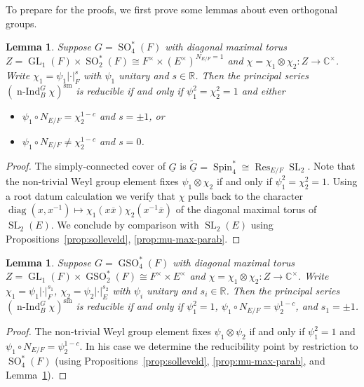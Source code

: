 \documentclass[a4paper]{amsart}
\numberwithin{equation}{section}
\newtheorem{lem}[thm]{Lemma}
\theoremstyle{remark}
\theoremstyle{definition}
\DeclareMathOperator{\nInd}{n-Ind}
\DeclareMathOperator{\diag}{diag}
\DeclareMathOperator{\Res}{Res}
\newcommand{\C}{\mathbb{C}}
\newcommand{\R}{\mathbb{R}}
\DeclareMathOperator{\SL}{SL}
\DeclareMathOperator{\SO}{SO}
\DeclareMathOperator{\GSO}{GSO}
\DeclareMathOperator{\Spin}{Spin}
\DeclareMathOperator{\GL}{GL}
\newcommand{\sm}{\mathrm{sm}}
\newcommand{\alggrp}[1]{\underline{#1}}
\renewcommand{\o}[1]{\overline{#1}}
\newcommand{\wt}[1]{\widetilde{#1}}
\begin{document}
To prepare for the proofs, we first prove some lemmas about even orthogonal groups.

\begin{lem}\label{lem:SO4}
  Suppose $G = \SO^*_4(F)$ with diagonal maximal torus $Z = \GL_1(F) \times \SO^*_2(F) \cong F^\times \times (E^\times)^{N_{E/F}=1}$ and $\chi= \chi_1 \otimes \chi_2: Z \to \C^\times$.
  Write $\chi_1 = \psi_1 \lvert\cdot\rvert_F^s$ with $\psi_1$ unitary and $s \in \R$.
  Then the principal series $(\nInd_{B}^{G}\chi)^{\sm}$ is reducible if and only if $\psi_1^2 = \chi_2^2 = 1$ and either
  \begin{itemize}
  \item $\psi_1 \circ N_{E/F} = \chi_2^{1-c}$ and $s = \pm 1$, or
  \item $\psi_1 \circ N_{E/F} \ne \chi_2^{1-c}$ and $s = 0$.
  \end{itemize}\end{lem}

\begin{proof}
  The simply-connected cover of $\alggrp G$ is $\wt{\alggrp{G}} = \Spin^*_4 \cong \Res_{E/F} \SL_2$.
  Note that the non-trivial Weyl group element fixes $\psi_1 \otimes \chi_2$ if and only if $\psi_1^2 = \chi_2^2 = 1$.
  Using a root datum calculation we verify that $\chi$ pulls back to the character $\diag(x,x^{-1}) \mapsto \chi_1(x \o x) \chi_2(x^{-1}\o x)$ of the diagonal maximal torus of $\SL_2(E)$.
  We conclude by comparison with $\SL_2(E)$ using Propositions~\ref{prop:solleveld}, \ref{prop:mu-max-parab}.
\end{proof}

\begin{lem}\label{lem:GSO4}
  Suppose $G = \GSO^*_4(F)$ with diagonal maximal torus $Z = \GL_1(F) \times \GSO^*_2(F) \cong F^\times \times E^\times$ and $\chi= \chi_1 \otimes \chi_2: Z \to \C^\times$.
  Write $\chi_1 = \psi_1 \lvert\cdot\rvert_F^{s_1}$, $\chi_2 = \psi_2 \lvert\cdot\rvert_E^{s_2}$ with $\psi_i$ unitary and $s_i \in \R$.
  Then the principal series $(\nInd_{B}^{G}\chi)^{\sm}$ is reducible if and only if $\psi_1^2 = 1$, $\psi_1 \circ N_{E/F} = \psi_2^{1-c}$, and $s_1 = \pm 1$.
\end{lem}

\begin{proof}
  The non-trivial Weyl group element fixes $\psi_1 \otimes \psi_2$ if and only if $\psi_1^2 = 1$ and $\psi_1 \circ N_{E/F} = \psi_2^{1-c}$.
  In his case we determine the reducibility point by restriction to $\SO^*_4(F)$ (using Propositions~\ref{prop:solleveld}, \ref{prop:mu-max-parab}, and Lemma~\ref{lem:SO4}).
\end{proof}
\end{document}

